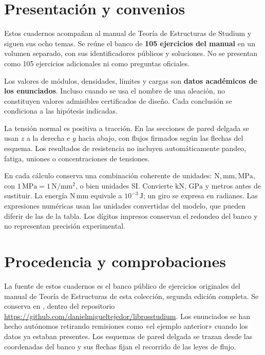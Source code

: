\documentclass[10pt,a4paper,openany]{book}
\begin{document}
\frontmatter
\studiumreadingguide
\chapter*{Presentación y convenios}
Estos cuadernos acompañan al manual de Teoría de Estructuras de Studium y siguen sus ocho temas. Se reúne el banco de \textbf{105 ejercicios del manual} en un volumen separado, con sus identificadores públicos y soluciones. No se presentan como 105 ejercicios adicionales ni como preguntas oficiales.

Los valores de módulos, densidades, límites y cargas son \textbf{datos académicos de los enunciados}. Incluso cuando se usa el nombre de una aleación, no constituyen valores admisibles certificados de diseño. Cada conclusión se condiciona a las hipótesis indicadas.

La tensión normal es positiva a tracción. En las secciones de pared delgada se usan $z$ a la derecha e $y$ hacia abajo, con flujos firmados según las flechas del esquema. Los resultados de resistencia no incluyen automáticamente pandeo, fatiga, uniones o concentraciones de tensiones.

En cada cálculo conserva una combinación coherente de unidades: $\mathrm{N,mm,MPa}$, con $1\,\mathrm{MPa}=1\,\mathrm{N/mm^2}$, o bien unidades SI. Convierte $\mathrm{kN}$, $\mathrm{GPa}$ y metros antes de sustituir. La energía $\mathrm{N\,mm}$ equivale a $10^{-3}\,\mathrm{J}$; un giro se expresa en radianes. Las expresiones numéricas usan las unidades convertidas del modelo, que pueden diferir de las de la tabla. Los dígitos impresos conservan el redondeo del banco y no representan precisión experimental.

\backmatter
\chapter*{Procedencia y comprobaciones}
La fuente de estos cuadernos es el banco público de ejercicios originales del manual de Teoría de Estructuras de esta colección, segunda edición completa. Se conserva en , dentro del repositorio \url{https://github.com/danielmigueltejedor/librosstudium}. Los enunciados se han hecho autónomos retirando remisiones como «el ejemplo anterior» cuando los datos ya estaban presentes. Los esquemas de pared delgada se trazan desde las coordenadas del banco y sus flechas fijan el recorrido de las leyes de flujo.
\end{document}
